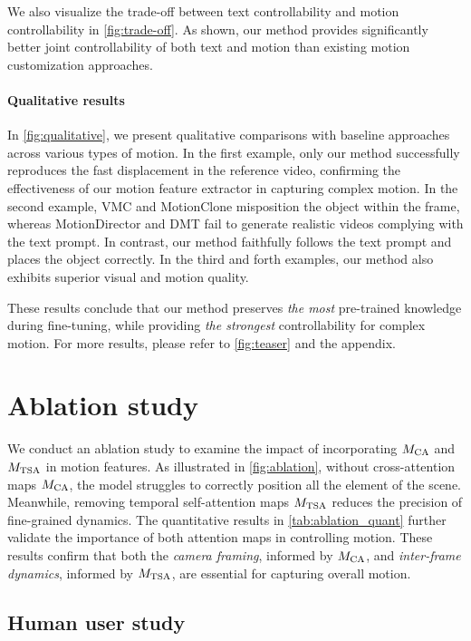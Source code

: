 We also visualize the trade-off between text controllability and motion controllability in \cref{fig:trade-off}. As shown, our method provides significantly better joint controllability of both text and motion than existing motion customization approaches.

\paragraph{Qualitative results}
In \cref{fig:qualitative}, we present qualitative comparisons with baseline approaches across various types of motion. In the first example, only our method successfully reproduces the fast displacement in the reference video, confirming the effectiveness of our motion feature extractor in capturing complex motion. In the second example, VMC and MotionClone misposition the object within the frame, whereas MotionDirector and DMT fail to generate realistic videos complying with the text prompt. In contrast, our method faithfully follows the text prompt and places the object correctly. In the third and forth examples, our method also exhibits superior visual and motion quality.

These results conclude that our method preserves \emph{the most} pre-trained knowledge during fine-tuning, while providing \emph{the strongest} controllability for complex motion. For more results, please refer to \cref{fig:teaser} and the appendix.

\section{Ablation study}
\label{sec:ablation}

We conduct an ablation study to examine the impact of incorporating $M_{{\rm CA}}$ and $M_{{\rm TSA}}$ in motion features. As illustrated in \cref{fig:ablation}, without cross-attention maps $M_{{\rm CA}}$, the model struggles to correctly position all the element of the scene. Meanwhile, removing temporal self-attention maps $M_{{\rm TSA}}$ reduces the precision of fine-grained dynamics. The quantitative results in \cref{tab:ablation_quant} further validate the importance of both attention maps in controlling motion. These results confirm that both the \emph{camera framing}, informed by $M_{{\rm CA}}$, and \emph{inter-frame dynamics}, informed by $M_{{\rm TSA}}$, are essential for capturing overall motion.

\subsection{Human user study}

